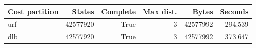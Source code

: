 {\small
\begin{tabular}{lrrrrr}
\hline
Cost partition & States & Complete & Max dist. & Bytes & Seconds \\
\hline
urf & 42577920 & True & 3 & 42577992 & 294.539 \\
dlb & 42577920 & True & 3 & 42577992 & 373.647 \\
\hline
\end{tabular}
}
